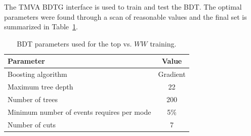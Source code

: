 The TMVA BDTG interface is used to train and test the BDT. The optimal parameters were found through a scan of reasonable values and the final set is summarized in Table~\ref{tab:WWBDTparameters}.
\begin{table}[h!]
\centering
\begin{tabular}{|l|c|}
\hline
Parameter                                    & Value     \\
\hline
Boosting algorithm                           &  Gradient  \\
Maximum tree depth                           &  22       \\
Number of trees                              &  200     \\
Minimum number of events requires per mode   &  5\%      \\
Number of cuts                               &  7        \\
\hline
\end{tabular}
\caption{BDT parameters used for the top vs. $WW$ training.} 
\label{tab:WWBDTparameters}
\end{table}

